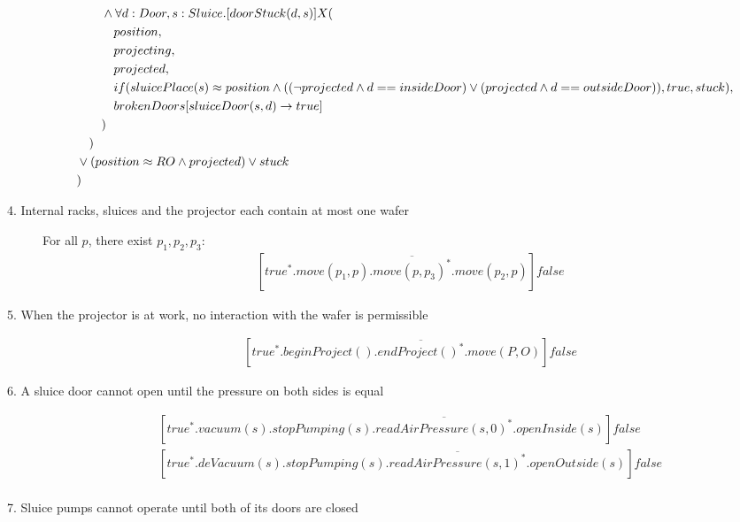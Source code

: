 \begin{description}
\begin{align*}
&  \tab\tab  \wedge \forall d:Door,s:Sluice.[doorStuck(d, s)]X( \\
&  \tab\tab                        \tab                        position, \\
&  \tab\tab                        \tab                        projecting, \\
&  \tab\tab                        \tab                        projected, \\
&  \tab\tab                        \tab                        if(sluicePlace(s) \approx position \wedge ((\neg projected \wedge d == insideDoor) \vee (projected \wedge d == outsideDoor)), true, stuck), \\
&  \tab\tab                       \tab brokenDoors[sluiceDoor(s,d)\to true] \\
&  \tab\tab                                              ) \\
&  \tab ) \\
&  \vee (position \approx RO \wedge projected) \vee stuck \\
&)
	\end{align*}

 
 \item[4. Internal racks, sluices and the projector each contain at most one wafer]
    
    For all $p$, there exist $p_1, p_2, p_3$:
	\begin{align*}
		&[true^*.move(p_1, p).\overline{move(p,p_3)^*}.move(p_2,p)]false
	\end{align*}

 
 \item[5. When the projector is at work, no interaction with the wafer is permissible]
 	\begin{align*}
 		&[true^*.beginProject().\overline{endProject()^*}.move(P,O)]false
	\end{align*}
	
 \item[6. A sluice door cannot open until the pressure on both sides is equal]
	\begin{align*}
		&[true^*.vacuum(s).stopPumping(s).\overline{readAirPressure(s,0)^*}.openInside(s)]false \\
		&[true^*.deVacuum(s).stopPumping(s).\overline{readAirPressure(s,1)^*}.openOutside(s)]false \\
	\end{align*}
	
 \item[7. Sluice pumps cannot operate until both of its doors are closed]
 

\end{description}
